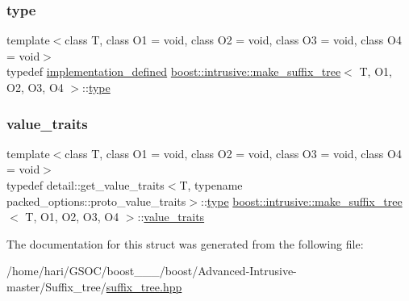 \mbox{\label{structboost_1_1intrusive_1_1make__suffix__tree_af7a1a8fa230f6e5be3305bdc0f8287b1}} 
\subsubsection{\texorpdfstring{type}{type}}
{\footnotesize\ttfamily template$<$class T, class O1 = void, class O2 = void, class O3 = void, class O4 = void$>$ \\
typedef \hyperlink{structboost_1_1intrusive_1_1make__suffix__tree_a4f100a03f40c26d5b31299af18214df1}{implementation\+\_\+defined} \hyperlink{structboost_1_1intrusive_1_1make__suffix__tree}{boost\+::intrusive\+::make\+\_\+suffix\+\_\+tree}$<$ T, O1, O2, O3, O4 $>$\+::\hyperlink{structboost_1_1intrusive_1_1make__suffix__tree_af7a1a8fa230f6e5be3305bdc0f8287b1}{type}}

\mbox{\label{structboost_1_1intrusive_1_1make__suffix__tree_a9274e519ecd5f67199f45a6b29c86c04}} 
\subsubsection{\texorpdfstring{value\+\_\+traits}{value\_traits}}
{\footnotesize\ttfamily template$<$class T, class O1 = void, class O2 = void, class O3 = void, class O4 = void$>$ \\
typedef detail\+::get\+\_\+value\+\_\+traits$<$T, typename packed\+\_\+options\+::proto\+\_\+value\+\_\+traits$>$\+::\hyperlink{structboost_1_1intrusive_1_1make__suffix__tree_af7a1a8fa230f6e5be3305bdc0f8287b1}{type} \hyperlink{structboost_1_1intrusive_1_1make__suffix__tree}{boost\+::intrusive\+::make\+\_\+suffix\+\_\+tree}$<$ T, O1, O2, O3, O4 $>$\+::\hyperlink{structboost_1_1intrusive_1_1make__suffix__tree_a9274e519ecd5f67199f45a6b29c86c04}{value\+\_\+traits}}



The documentation for this struct was generated from the following file\+:\begin{DoxyCompactItemize}
\item 
/home/hari/\+G\+S\+O\+C/boost\+\_\+\_\+\_/boost/\+Advanced-\/\+Intrusive-\/master/\+Suffix\+\_\+tree/\hyperlink{suffix__tree_8hpp}{suffix\+\_\+tree.\+hpp}\end{DoxyCompactItemize}
